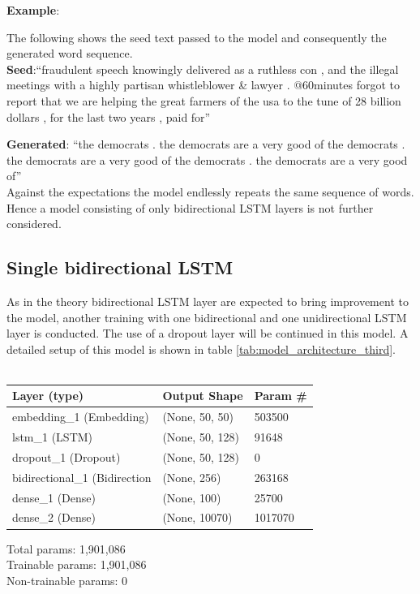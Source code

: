 \documentclass[hidelinks, conference]{IEEEtran}
\begin{document}
\textbf{Example}:

The following shows the seed text passed to the model and consequently the generated word sequence.\\

\textbf{Seed}:``fraudulent speech knowingly delivered as a ruthless con , and the illegal meetings with a highly partisan whistleblower \& lawyer . @60minutes forgot to report that we are helping the great farmers of the usa to the tune of 28 billion dollars , for the last two years , paid for''

\textbf{Generated}: ``the democrats . the democrats are a very good of the democrats . the democrats are a very good of the democrats . the democrats are a very good of''\\

Against the expectations the model endlessly repeats the same sequence of words. Hence a model consisting of only bidirectional LSTM layers is not further considered.

\subsection{Single bidirectional LSTM}

As in the theory bidirectional LSTM layer are expected to bring improvement to the model, another training with one bidirectional and one unidirectional LSTM layer is conducted. The use of a dropout layer will be continued in this model. A detailed setup of this model is shown in table \ref{tab:model_architecture_third}.\\
\\

\begin{center}
\begin{tabular}{l l l}
\hline
Layer (type) & Output Shape & Param \#\\
\hline
\hline
embedding\_1 (Embedding) & (None, 50, 50) & 503500\\
\hline
lstm\_1 (LSTM) & (None, 50, 128) & 91648\\
\hline
dropout\_1 (Dropout) & (None, 50, 128) & 0\\
\hline
bidirectional\_1 (Bidirection & (None, 256) & 263168\\
\hline
dense\_1 (Dense) & (None, 100) & 25700\\
\hline
dense\_2 (Dense) & (None, 10070) & 1017070\\
\hline
\hline
\end{tabular}
\begin{flushleft}
Total params: 1,901,086\\
Trainable params: 1,901,086\\
Non-trainable params: 0
\end{flushleft}
\end{center}
\end{document}
